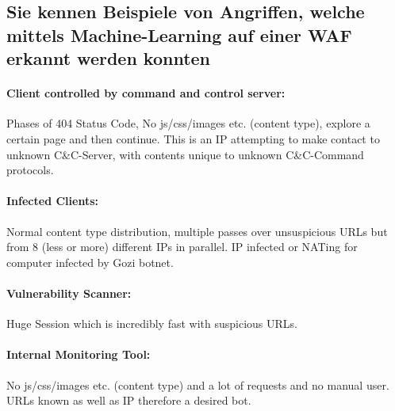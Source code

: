 \documentclass[10pt,a4paper]{article}
\begin{document}
\subsection*{Sie kennen Beispiele von Angriffen, welche mittels Machine-Learning auf einer WAF erkannt werden konnten}
\paragraph*{Client controlled by command and control server:} Phases of 404 Status Code, No js/css/images etc. (content type), explore a certain page and then continue. This is an IP attempting to make contact to unknown C\&C-Server, with contents unique to unknown C\&C-Command protocols.

\paragraph*{Infected Clients:} Normal content type distribution, multiple passes over unsuspicious URLs but from 8 (less or more) different IPs in parallel. IP infected or NATing for computer infected by Gozi botnet.

\paragraph*{Vulnerability Scanner:} Huge Session which is incredibly fast with suspicious URLs.

\paragraph*{Internal Monitoring Tool:}  No js/css/images etc. (content type) and a lot of requests and no manual user. URLs known as well as IP therefore a desired bot.

\printindex
\listoffigures
\newpage
\printbibliography[title={Quellen}]
\end{document}
